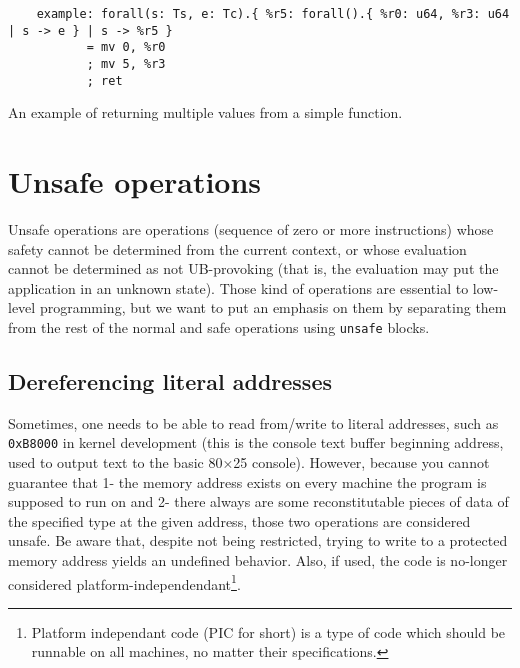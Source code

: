 \begin{listing}[htb]
  \centering
  \begin{minipage}{0.90\textwidth}
    \begin{verbatim}
    example: forall(s: Ts, e: Tc).{ %r5: forall().{ %r0: u64, %r3: u64 | s -> e } | s -> %r5 }
           = mv 0, %r0
           ; mv 5, %r3
           ; ret
    \end{verbatim}
  \end{minipage}
  \caption{An example of returning multiple values from a simple function.}
  \label{lst:nstar-common-bs-returnvalues}
\end{listing}

\section{Unsafe operations}\label{sec:nstar-common-unsafe}

Unsafe operations are operations (sequence of zero or more instructions) whose safety cannot be determined from the current context, or whose evaluation cannot be determined as not UB-provoking (that is, the evaluation may put the application in an unknown state).
Those kind of operations are essential to low-level programming, but we want to put an emphasis on them by separating them from the rest of the normal and safe operations using \texttt{unsafe} blocks.

\subsection{Dereferencing literal addresses}\label{subsec:nstar-common-unsafe-derefliteraladdr}

Sometimes, one needs to be able to read from/write to literal addresses, such as \texttt{0xB8000} in kernel development (this is the console text buffer beginning address, used to output text to the basic 80×25 console).
However, because you cannot guarantee that 1- the memory address exists on every machine the program is supposed to run on and 2- there always are some reconstitutable pieces of data of the specified type at the given address, those two operations are considered unsafe.
Be aware that, despite not being restricted, trying to write to a protected memory address yields an undefined behavior.
Also, if used, the code is no-longer considered platform-independendant\footnote{Platform independant code (PIC for short) is a type of code which should be runnable on all machines, no matter their specifications.}.

